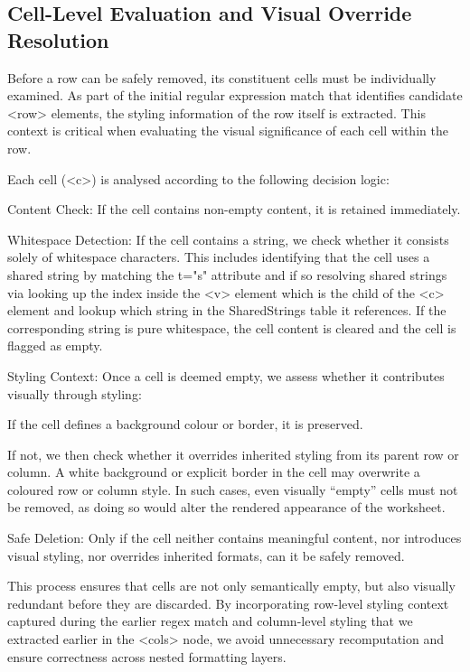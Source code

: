 \subsection{Cell-Level Evaluation and Visual Override Resolution}

Before a row can be safely removed, its constituent cells must be individually examined. As part of the initial regular expression match that identifies candidate <row> elements, the styling information of the row itself is extracted. This context is critical when evaluating the visual significance of each cell within the row.

Each cell (<c>) is analysed according to the following decision logic:

Content Check: If the cell contains non-empty content, it is retained immediately.

Whitespace Detection: If the cell contains a string, we check whether it consists solely of whitespace characters. This includes identifying that the cell uses a shared string by matching the t="s" attribute and if so resolving shared strings via looking up the index inside the <v> element which is the child of the <c> element and lookup which string in the SharedStrings table it references. If the corresponding string is pure whitespace, the cell content is cleared and the cell is flagged as empty.

Styling Context: Once a cell is deemed empty, we assess whether it contributes visually through styling:

If the cell defines a background colour or border, it is preserved.

If not, we then check whether it overrides inherited styling from its parent row or column. A white background or explicit border in the cell may overwrite a coloured row or column style. In such cases, even visually “empty” cells must not be removed, as doing so would alter the rendered appearance of the worksheet.

Safe Deletion: Only if the cell neither contains meaningful content, nor introduces visual styling, nor overrides inherited formats, can it be safely removed.

This process ensures that cells are not only semantically empty, but also visually redundant before they are discarded. By incorporating row-level styling context captured during the earlier regex match and column-level styling that we extracted earlier in the <cols> node, we avoid unnecessary recomputation and ensure correctness across nested formatting layers.




